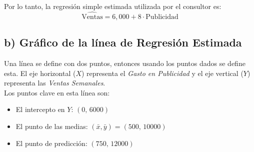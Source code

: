\documentclass[12pt]{article}
\begin{document}
Por lo tanto, la regresión simple estimada utilizada por el consultor es:
$$
\hat{\text{Ventas}} = 6,000 + 8 \cdot \text{Publicidad}
$$

\subsection*{b) Gráfico de la línea de Regresión Estimada}

Una línea se define con dos puntos, entonces usando los puntos dados se define esta. 
El eje horizontal ($X$) representa el \emph{Gasto en Publicidad} y el eje vertical ($Y$) representa las \emph{Ventas Semanales}.\\

Los puntos clave en esta línea son:

\begin{itemize}
    \item El intercepto en $Y$: $(0,\,6000)$
    \item El punto de las medias: $(\bar{x},\bar{y}) = (500,\,10000)$
    \item El punto de predicción: $(750,\,12000)$
\end{itemize}
\end{document}
